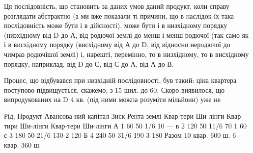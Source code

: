 Ця послідовність,
що становить за даних умов даний продукт, коли справу розглядати
абстрактно (а ми вже показали ті причини, що в наслідок їх така послідовність
може бути і в дійсності), може бути і в низхідному порядку (низхідному
від D до А, від родючої землі до менш і менш родючої (так само як і в висхідному
порядку (висхідному від А до D, від відносно неродючої до чимраз родючішої землі)
і, нарешті, перемінно, то в низхідному, то в висхідному порядку, наприклад,
від D до С, від С до А, від А до В.

Процес, що відбувався при низхідній послідовності, був такий: ціна квартера
поступово підвищується, скажемо, з 15 шил. до 60. Скоро виявилося, що
випродукованих на D 4 кв. (під ними можпа розуміти мільйони) уже не

Рід, Продукт        Авансова-ний капітал    Зиск    Рента
землі    Квар-тери    Ши  лінги        Квар-тири    Ши-лінги    Квар-тери    Ши-лінги
А    1    60    50    1/6    10 —
в    2    120    50    11/6    70    1    60
с    3    180    50    21/6    130    2    120
Б    4    240    50    31/6    190    3    180
Разом 10 квар. 600 ш.                6 квар. 360 ш.
\parbreak{}  %
